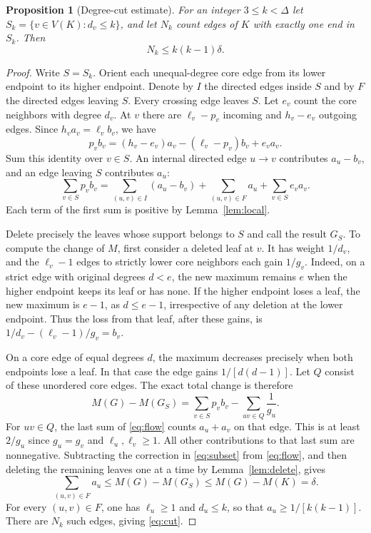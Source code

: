 \documentclass[11pt,a4paper]{article}
\newtheorem{proposition}[theorem]{Proposition}
\begin{document}
\begin{proposition}[Degree-cut estimate]\label{prop:cut}
For an integer $3\le k<\Delta$ let $S_k=\{v\in V(K):d_v\le k\}$,
and let $N_k$ count edges of $K$ with exactly one end in $S_k$. Then
\begin{equation}\label{eq:cut}
 N_k\le k(k-1)\delta .
\end{equation}
\end{proposition}
\begin{proof}
Write $S=S_k$. Orient each unequal-degree core edge from its lower
endpoint to its higher endpoint. Denote by $I$ the directed edges
inside $S$ and by $F$ the directed edges leaving $S$. Every crossing
edge leaves $S$. Let $e_v$ count the core neighbors with degree $d_v$.
At $v$ there are $\ell_v-p_v$ incoming and $h_v-e_v$ outgoing edges.
Since $h_v a_v=\ell_v b_v$, we have
\[
 p_v b_v=(h_v-e_v)a_v-(\ell_v-p_v)b_v+e_v a_v .
\]
Sum this identity over $v\in S$. An internal directed edge $u\to v$
contributes $a_u-b_v$, and an edge leaving $S$ contributes $a_u$:
\begin{equation}\label{eq:flow}
 \sum_{v\in S}p_v b_v
 =\sum_{(u,v)\in I}(a_u-b_v)+\sum_{(u,v)\in F}a_u
        +\sum_{v\in S}e_v a_v .
\end{equation}
Each term of the first sum is positive by Lemma~\ref{lem:local}.

Delete precisely the leaves whose support belongs to $S$ and call the
result $G_S$. To compute the change of $M$, first consider a deleted
leaf at $v$. It has weight $1/d_v$, and the $\ell_v-1$ edges to
strictly lower core neighbors each gain $1/g_v$. Indeed, on a strict
edge with original degrees $d<e$, the new maximum remains $e$ when
the higher endpoint keeps its leaf or has none. If the higher endpoint
loses a leaf, the new maximum is $e-1$, as $d\le e-1$, irrespective
of any deletion at the lower endpoint. Thus the loss from that leaf,
after these gains, is $1/d_v-(\ell_v-1)/g_v=b_v$.

On a core edge of equal degrees $d$, the maximum decreases precisely
when both endpoints lose a leaf. In that case the edge gains
$1/[d(d-1)]$. Let $Q$ consist of these unordered core edges. The
exact total change is therefore
\begin{equation}\label{eq:subset}
 M(G)-M(G_S)=\sum_{v\in S}p_v b_v-\sum_{uv\in Q}\frac1{g_u}.
\end{equation}
For $uv\in Q$, the last sum of \eqref{eq:flow} counts $a_u+a_v$
on that edge. This is at least $2/g_u$ since $g_u=g_v$ and
$\ell_u,\ell_v\ge1$. All other contributions to that last sum are
nonnegative. Subtracting the correction in \eqref{eq:subset} from
\eqref{eq:flow}, and then deleting the remaining leaves one at a time
by Lemma~\ref{lem:delete}, gives
\[
 \sum_{(u,v)\in F}a_u\le M(G)-M(G_S)\le M(G)-M(K)=\delta .
\]
For every $(u,v)\in F$, one has $\ell_u\ge1$ and $d_u\le k$, so that
$a_u\ge1/[k(k-1)]$. There are $N_k$ such edges, giving \eqref{eq:cut}.
\end{proof}
\end{document}
